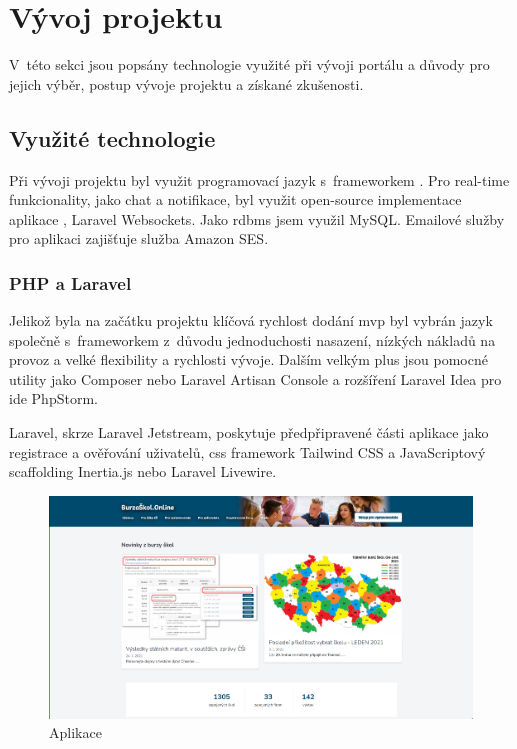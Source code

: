 \section{Vývoj projektu}

V~této sekci jsou popsány technologie využité při vývoji portálu \bso a důvody pro jejich výběr, postup vývoje projektu a získané zkušenosti.

\subsection{Využité technologie}
\label{sub:used-technologies}

Při vývoji projektu byl využit programovací jazyk  s~\gls{framework}em  . Pro \gls{real-time} funkcionality, jako chat a notifikace, byl využit \gls{open-source} implementace aplikace , Laravel Websockets\cite{laravel-websockets}. Jako \acrshort{rdbms} jsem využil MySQL\cite{mysql}. Emailové služby pro aplikaci zajišťuje služba Amazon SES\cite{amazon-ses}.

\subsubsection{PHP a Laravel}

Jelikož byla na začátku projektu \bso klíčová rychlost dodání \gls{mvp} byl vybrán jazyk  společně s~\gls{framework}em  z~důvodu jednoduchosti nasazení, nízkých nákladů na provoz a velké flexibility a rychlosti vývoje. Dalším velkým plus jsou pomocné utility jako Composer\cite{composer} nebo Laravel Artisan Console\cite{laravel-artisan} a rozšíření Laravel Idea\cite{laravel-idea} pro \acrshort{ide} PhpStorm\cite{phpstorm}.

Laravel, skrze Laravel Jetstream\cite{laravel-jetstream}, poskytuje předpřipravené části aplikace jako registrace a ověřování uživatelů, \acrshort{css} \gls{framework} Tailwind CSS\cite{tailwind-css} a JavaScriptový \gls{scaffolding} Inertia.js\cite{inertia-js} nebo Laravel Livewire\cite{laravel-livewire}.

\begin{figure}[h]
\centering
\includegraphics[width=\textwidth]{img/burzaskol-online.png}
\caption{Aplikace \bso}
\label{fig:burzaskol-online-2020}
\end{figure}

